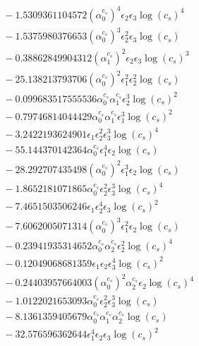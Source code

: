 \documentclass[10pt]{article}
\begin{document}
\begin{align*}
&{}  - 1.5309361104572 \left(\alpha_{0}^{c_s}\right)^{4} \epsilon_{2} \epsilon_{3} \log{\left(c_{s} \right)}^{4} \\
&{}  - 1.5375980376653 \left(\alpha_{0}^{c_s}\right)^{3} \epsilon_{2}^{2} \epsilon_{3} \log{\left(c_{s} \right)} \\
&{}  - 0.38862849904312 \left(\alpha_{1}^{c_s}\right)^{2} \epsilon_{2} \epsilon_{3} \log{\left(c_{s} \right)}^{3} \\
&{}  - 25.138213793706 \left(\alpha_{0}^{c_s}\right)^{2} \epsilon_{1}^{2} \epsilon_{2}^{2} \log{\left(c_{s} \right)} \\
&{}  - 0.099683517555536 \alpha_{0}^{c_s} \alpha_{1}^{c_s} \epsilon_{2}^{3} \log{\left(c_{s} \right)}^{2} \\
&{}  - 0.79746814044429 \alpha_{0}^{c_s} \alpha_{1}^{c_s} \epsilon_{1}^{3} \log{\left(c_{s} \right)}^{2} \\
&{}  - 3.2422193624901 \epsilon_{1} \epsilon_{2}^{2} \epsilon_{3}^{3} \log{\left(c_{s} \right)}^{4} \\
&{}  - 55.144370142364 \alpha_{0}^{c_s} \epsilon_{1}^{4} \epsilon_{2} \log{\left(c_{s} \right)} \\
&{}  - 28.292707435498 \left(\alpha_{0}^{c_s}\right)^{2} \epsilon_{1}^{3} \epsilon_{2} \log{\left(c_{s} \right)} \\
&{}  - 1.8652181071865 \alpha_{0}^{c_s} \epsilon_{2}^{2} \epsilon_{3}^{3} \log{\left(c_{s} \right)}^{4} \\
&{}  - 7.4651503506246 \epsilon_{1} \epsilon_{2}^{4} \epsilon_{3} \log{\left(c_{s} \right)}^{2} \\
&{}  - 7.6062005071314 \left(\alpha_{0}^{c_s}\right)^{3} \epsilon_{1}^{2} \epsilon_{2} \log{\left(c_{s} \right)} \\
&{}  - 0.23941935314652 \alpha_{0}^{c_s} \alpha_{2}^{c_s} \epsilon_{2}^{2} \log{\left(c_{s} \right)}^{4} \\
&{}  - 0.12049068681359 \epsilon_{1} \epsilon_{2} \epsilon_{3}^{4} \log{\left(c_{s} \right)}^{2} \\
&{}  - 0.24403957664003 \left(\alpha_{0}^{c_s}\right)^{2} \alpha_{2}^{c_s} \epsilon_{2} \log{\left(c_{s} \right)}^{4} \\
&{}  - 1.0122021653093 \alpha_{0}^{c_s} \epsilon_{2}^{2} \epsilon_{3}^{3} \log{\left(c_{s} \right)} \\
&{}  - 8.1361359405679 \alpha_{0}^{c_s} \alpha_{1}^{c_s} \alpha_{2}^{c_s} \log{\left(c_{s} \right)} \\
&{}  - 32.576596362644 \epsilon_{1}^{4} \epsilon_{2} \epsilon_{3} \log{\left(c_{s} \right)}^{2} \\

\end{align*}
\end{document}
